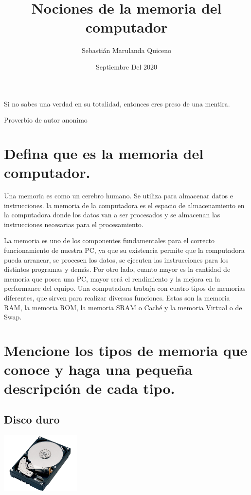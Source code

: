 \documentclass[a4paper]{article}
\title{Nociones de la memoria del computador}
\author{Sebastián Marulanda Quiceno}
\date{Septiembre Del 2020}
\begin{document}
\maketitle

\epigraph{Si no sabes una verdad en su totalidad, entonces eres preso de una mentira.}{Proverbio de autor anonimo}


\section{Defina que es la memoria del computador.}

Una memoria es como un cerebro humano. Se utiliza para almacenar datos e instrucciones. la memoria de la computadora es el espacio de almacenamiento en la computadora donde los datos van a ser procesados y se almacenan las instrucciones necesarias para el procesamiento. 

La memoria es uno de los componentes fundamentales para el correcto funcionamiento de nuestra PC, ya que su existencia permite que la computadora pueda arrancar, se procesen los datos, se ejecuten las instrucciones para los distintos programas y demás. Por otro lado, cuanto mayor es la cantidad de memoria que posea una PC, mayor será el rendimiento y la mejora en la performance del equipo. Una computadora trabaja con cuatro tipos de memorias diferentes, que sirven para realizar diversas funciones. Estas son la memoria RAM, la memoria ROM, la memoria SRAM o Caché y la memoria Virtual o de Swap.


\section{Mencione los tipos de memoria que conoce y haga una pequeña descripción de cada tipo.}
\label{sec:examples}

\subsection{Disco duro}

    \begin{center}
    \includegraphics[width=0.3\textwidth]{images/discoduro.jpg}
    \end{center}
    
\end{document}
